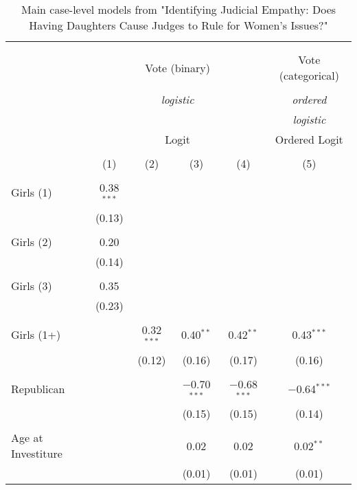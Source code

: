 
\begin{table}[h] \centering 
  \caption{Main case-level models from "Identifying Judicial Empathy: Does Having Daughters Cause Judges to Rule for Women's Issues?"} 
  \label{replication_table_cases} 
\begin{adjustbox}{width=1\textwidth}\begin{tabular}{@{\extracolsep{5pt}}lccccc} 
\\[-1.8ex]\hline 
\hline \\[-1.8ex] 
\\[-1.8ex] & \multicolumn{4}{c}{Vote (binary)} & Vote (categorical) \\ 
\\[-1.8ex] & \multicolumn{4}{c}{\textit{logistic}} & \textit{ordered} \\ 
 & \multicolumn{4}{c}{\textit{}} & \textit{logistic} \\ 
 & \multicolumn{4}{c}{Logit} & Ordered Logit \\ 
\\[-1.8ex] & (1) & (2) & (3) & (4) & (5)\\ 
\hline \\[-1.8ex] 
 Girls (1) & 0.38$^{***}$ &  &  &  &  \\ 
  & (0.13) &  &  &  &  \\ 
  & & & & & \\ 
 Girls (2) & 0.20 &  &  &  &  \\ 
  & (0.14) &  &  &  &  \\ 
  & & & & & \\ 
 Girls (3) & 0.35 &  &  &  &  \\ 
  & (0.23) &  &  &  &  \\ 
  & & & & & \\ 
 Girls (1+) &  & 0.32$^{***}$ & 0.40$^{**}$ & 0.42$^{**}$ & 0.43$^{***}$ \\ 
  &  & (0.12) & (0.16) & (0.17) & (0.16) \\ 
  & & & & & \\ 
 Republican &  &  & $-$0.70$^{***}$ & $-$0.68$^{***}$ & $-$0.64$^{***}$ \\ 
  &  &  & (0.15) & (0.15) & (0.14) \\ 
  & & & & & \\ 
 Age at Investiture &  &  & 0.02 & 0.02 & 0.02$^{**}$ \\ 
  &  &  & (0.01) & (0.01) & (0.01) \\ 

\end{tabular}
\end{adjustbox}
\end{table}
